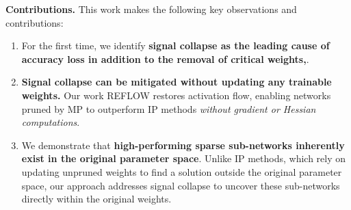 \noindent\textbf{Contributions.} This work makes the following key observations and contributions: \begin{enumerate} 
\item 
For the first time, we identify \textbf{signal collapse as the leading cause of accuracy loss in addition to the removal of critical weights,}. 
\item 
\textbf{Signal collapse can be mitigated without updating any trainable weights.} Our work
REFLOW restores activation flow, enabling networks pruned by MP to outperform IP methods \textit{without gradient or Hessian computations}.
\item 
We demonstrate that \textbf{high-performing sparse sub-networks inherently exist in the original parameter space}. Unlike IP methods, which rely on updating unpruned weights to find a solution outside the original parameter space, our approach addresses signal collapse to uncover these sub-networks directly within the original weights. \end{enumerate}

















